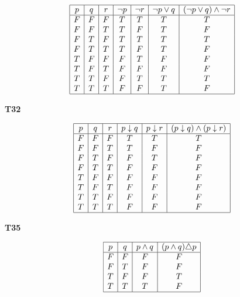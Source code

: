 \documentclass{article}
\begin{document}
\[
\begin{array}{|c|c|c|c|c|c|c|}
    \hline
    p & q & r & \lnot p & \lnot r & \lnot p \lor q & (\lnot p \lor q) \land \lnot r\\
    \hline
    F & F & F & T & T & T & T\\
    F & F & T & T & F & T & F\\
    F & T & F & T & T & T & T\\
    F & T & T & T & F & T & F\\
    T & F & F & F & T & F & F\\
    T & F & T & F & F & F & F\\
    T & T & F & F & T & T & T\\
    T & T & T & F & F & T & F\\
    \hline
\end{array}
\]

\vspace{10pt}

\textbf{T32}

\[
\begin{array}{|c|c|c|c|c|c|}
    \hline
    p & q & r & p \downarrow q & p \downarrow r & (p \downarrow q) \land (p \downarrow r)\\
    \hline
    F & F & F & T & T & T\\
    F & F & T & T & F & F\\
    F & T & F & F & T & F\\
    F & T & T & F & F & F\\
    T & F & F & F & F & F\\
    T & F & T & F & F & F\\
    T & T & F & F & F & F\\
    T & T & T & F & F & F\\
    \hline
\end{array}
\]

\vspace{10pt}

\textbf{T35}

\[
\begin{array}{|c|c|c|c|}
    \hline
    p & q & p \land q & (p \land q) \triangle p\\
    \hline
    F & F & F & F\\
    F & T & F & F\\
    T & F & F & T\\
    T & T & T & F\\
    \hline
\end{array}
\]
\end{document}
